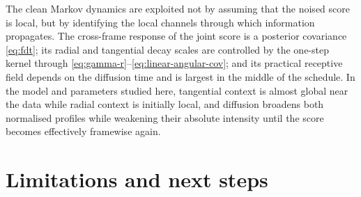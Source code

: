 \documentclass[11pt,a4paper]{article}
\begin{document}
\begin{keyresult}
The clean Markov dynamics are exploited not by assuming that the noised score is local, but by
identifying the local channels through which information propagates. The cross-frame response
of the joint score is a posterior covariance \eqref{eq:fdt}; its radial and tangential decay
scales are controlled by the one-step kernel through
\eqref{eq:gamma-r}--\eqref{eq:linear-angular-cov}; and its practical receptive field depends on
the diffusion time and is largest in the middle of the schedule. In the model and parameters
studied here, tangential context is almost global near the data while radial context is
initially local, and diffusion broadens both normalised profiles while weakening their
absolute intensity until the score becomes effectively framewise again.
\end{keyresult}

\section{Limitations and next steps}\label{sec:limitations}
\end{document}
